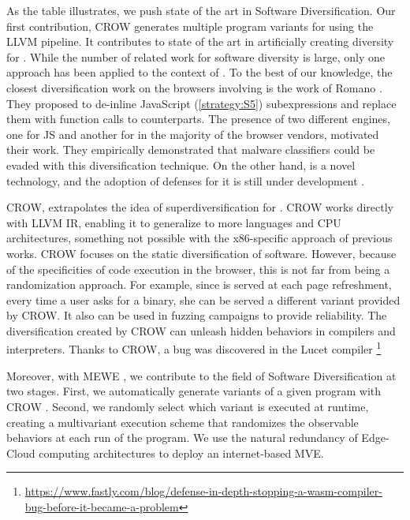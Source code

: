 

As the table illustrates, we push state of the art in Software Diversification. Our first contribution, CROW \cite{CROW} generates multiple program variants for \wasm using the LLVM pipeline.
It contributes to state of the art in artificially creating diversity for \wasm. While the number of related work for software diversity is large, only one approach has been applied to the context of \wasm. To the best of our knowledge, the closest diversification work on the browsers involving \wasm is the work of Romano \etal \cite{wobfuscator}. They proposed to de-inline JavaScript (\autoref{strategy:S5}) subexpressions and replace them with function calls to \wasm counterparts. The presence of two different engines, one for JS and another for \wasm in the majority of the browser vendors, motivated their work. They empirically demonstrated that malware classifiers could be evaded with this diversification technique. On the other hand, \wasm is a novel technology, and the adoption of defenses for it is still under development \cite{Narayan2021Swivel, johnson2021}.

CROW, extrapolates the idea of superdiversification \cite{jacob2008superdiversifier} for \wasm. CROW works directly with LLVM IR, enabling it to generalize to more languages and CPU architectures, something not possible with the x86-specific approach of previous works.
CROW focuses on the static diversification of software. However, because of the specificities of code execution in the browser, this is not far from being a randomization approach. For example, since \wasm is served at each page refreshment, every time a user asks for a \wasm binary, she can be served a different variant provided by CROW.
It also can be used in fuzzing campaigns \citationneeded to provide reliability. The diversification created by CROW can unleash hidden behaviors in compilers and interpreters. Thanks to CROW, a bug was discovered in the Lucet compiler \footnote{\url{https://www.fastly.com/blog/defense-in-depth-stopping-a-wasm-compiler-bug-before-it-became-a-problem}} 


Moreover, with MEWE \cite{MEWE}, we contribute to the field of Software Diversification at two stages. First, we automatically generate variants of a given program with CROW \cite{CROW}. Second, we randomly select which variant is executed at runtime, creating a multivariant execution scheme that randomizes the observable behaviors at each run of the program. We use the natural redundancy of Edge-Cloud computing architectures to deploy an internet-based MVE.



